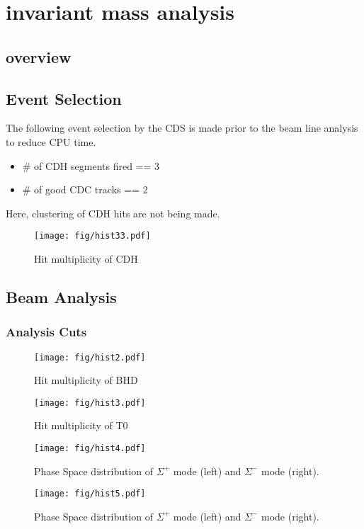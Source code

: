 \section{ \reaction invariant mass analysis}
\subsection{overview}


\subsection{Event Selection}
The following event selection by the CDS is made prior to the beam line analysis to reduce CPU time.
\begin{itemize}
\item \# of CDH segments fired == 3
\item \# of good CDC tracks == 2
\end{itemize}
Here, clustering of CDH hits are not being made.\\
\begin{figure}
\texttt{[image: fig/hist33.pdf]}
\caption{Hit multiplicity of CDH}
\end{figure}






\subsection{Beam Analysis}
\subsubsection{Analysis Cuts}

\begin{figure}
\texttt{[image: fig/hist2.pdf]}
\caption{Hit multiplicity of BHD}
\end{figure}
\begin{figure}
\texttt{[image: fig/hist3.pdf]}
\caption{Hit multiplicity of T0}
\end{figure}


\begin{figure}
\texttt{[image: fig/hist4.pdf]}
\caption{Phase Space distribution of $\Sigma^+$ mode (left) and $\Sigma^-$ mode (right).}
\end{figure}

\begin{figure}
\texttt{[image: fig/hist5.pdf]}
\caption{Phase Space distribution of $\Sigma^+$ mode (left) and $\Sigma^-$ mode (right).}
\end{figure}


